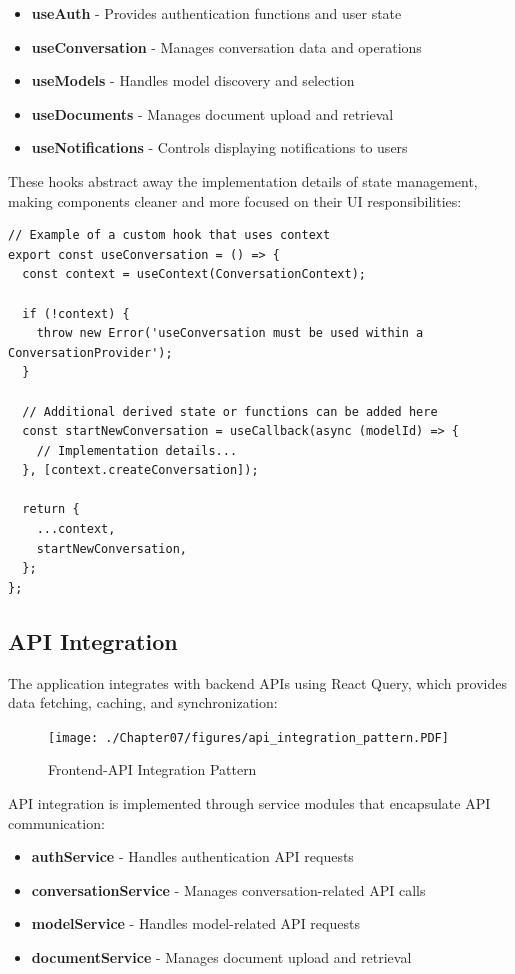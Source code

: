 \begin{itemize}
  \item \textbf{useAuth} - Provides authentication functions and user state
  \item \textbf{useConversation} - Manages conversation data and operations
  \item \textbf{useModels} - Handles model discovery and selection
  \item \textbf{useDocuments} - Manages document upload and retrieval
  \item \textbf{useNotifications} - Controls displaying notifications to users
\end{itemize}

These hooks abstract away the implementation details of state management, making components cleaner and more focused on their UI responsibilities:

\begin{verbatim}
// Example of a custom hook that uses context
export const useConversation = () => {
  const context = useContext(ConversationContext);
  
  if (!context) {
    throw new Error('useConversation must be used within a ConversationProvider');
  }
  
  // Additional derived state or functions can be added here
  const startNewConversation = useCallback(async (modelId) => {
    // Implementation details...
  }, [context.createConversation]);
  
  return {
    ...context,
    startNewConversation,
  };
};
\end{verbatim}

\subsection{API Integration}

The application integrates with backend APIs using React Query, which provides data fetching, caching, and synchronization:

\begin{figure}
    \centering
    \texttt{[image: ./Chapter07/figures/api\_integration\_pattern.PDF]}
    \caption{Frontend-API Integration Pattern}
    \label{fig:api-integration-pattern}
\end{figure}
\clearpage

API integration is implemented through service modules that encapsulate API communication:

\begin{itemize}
  \item \textbf{authService} - Handles authentication API requests
  \item \textbf{conversationService} - Manages conversation-related API calls
  \item \textbf{modelService} - Handles model-related API requests
  \item \textbf{documentService} - Manages document upload and retrieval
\end{itemize}

